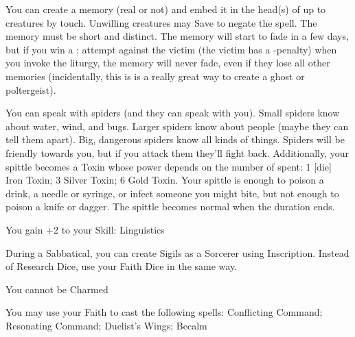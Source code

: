 {You can create a memory (real or not) and embed it in the head(s) of up to \DICE creatures by touch.  Unwilling creatures may Save to negate the spell.  The memory must be short and distinct.  The memory will start to fade in a few days, but if you win a \RB : \FOC attempt against the victim (the victim has a -\DICE penalty) when you invoke the liturgy, the memory will never fade, even if they lose all other memories (incidentally, this is is a really great way to create a ghost or poltergeist).

\LITURGY [
  Name= Spidertongue,
  Link=iktomi-liturgy-spidertongue,
  Paradigm= Biomancy ,
  Save=  Y (negates) ,
  Duration= Combat or \SUMDICE Minutes ,
  Counter=  n/a  ,
  Keywords= None ,
  Target=   Self
]



You can speak with spiders (and they can speak with you).  Small spiders know about water, wind, and bugs.  Larger spiders know about people (maybe they can tell them apart).  Big, dangerous spiders know all kinds of things.  Spiders will be friendly towards you, but if you attack them they'll fight back.  Additionally, your spittle becomes a Toxin whose power depends on the number of \DICE spent: 1 [die] Iron Toxin; 3 \DICE Silver Toxin; 6 \DICE Gold Toxin.  Your spittle is enough to poison a drink, a needle or syringe, or infect someone you might bite, but not enough to poison a knife or dagger.  The spittle becomes normal when the duration ends.





\GOD[
Name=Mímir,
Link=small-god-mímir,
GodOf=God of Runes,
Holy=a necklace of runes scribed on tiles
]


You gain +2 to your Skill: Linguistics


During a Sabbatical, you can create Sigils as a Sorcerer using Inscription.  Instead of Research Dice, use your Faith Dice in the same way.  




\GOD[
Name=The Grey Lords,
Link=small-god-the grey lords,
GodOf=Archons of Diplomacy,
Holy=a choker of dove feathers
]


You cannot be Charmed


You may use your Faith to cast the following spells: Conflicting Command; Resonating Command; Duelist's Wings; Becalm

}
